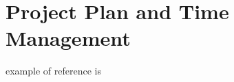 \clearpage
\section{Project Plan and Time Management}
example of reference is \cite{patel2011joomla}